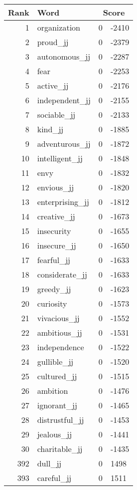\begin{longtable}[!htbp]{| rlr@{.}l |}
    \hline
    \textbf{Rank} & \textbf{Word} & \multicolumn{2}{c|}{\textbf{Score}} \\
    \hline
    \endhead
    1 & organization & 0 & -2410 \\
    2 & proud\_jj & 0 & -2379 \\
    3 & autonomous\_jj & 0 & -2287 \\
    4 & fear & 0 & -2253 \\
    5 & active\_jj & 0 & -2176 \\
    6 & independent\_jj & 0 & -2155 \\
    7 & sociable\_jj & 0 & -2133 \\
    8 & kind\_jj & 0 & -1885 \\
    9 & adventurous\_jj & 0 & -1872 \\
    10 & intelligent\_jj & 0 & -1848 \\
    11 & envy & 0 & -1832 \\
    12 & envious\_jj & 0 & -1820 \\
    13 & enterprising\_jj & 0 & -1812 \\
    14 & creative\_jj & 0 & -1673 \\
    15 & insecurity & 0 & -1655 \\
    16 & insecure\_jj & 0 & -1650 \\
    17 & fearful\_jj & 0 & -1633 \\
    18 & considerate\_jj & 0 & -1633 \\
    19 & greedy\_jj & 0 & -1623 \\
    20 & curiosity & 0 & -1573 \\
    21 & vivacious\_jj & 0 & -1552 \\
    22 & ambitious\_jj & 0 & -1531 \\
    23 & independence & 0 & -1522 \\
    24 & gullible\_jj & 0 & -1520 \\
    25 & cultured\_jj & 0 & -1515 \\
    26 & ambition & 0 & -1476 \\
    27 & ignorant\_jj & 0 & -1465 \\
    28 & distrustful\_jj & 0 & -1453 \\
    29 & jealous\_jj & 0 & -1441 \\
    30 & charitable\_jj & 0 & -1435 \\
    392 & dull\_jj & 0 & 1498 \\
    393 & careful\_jj & 0 & 1511 \\

\end{longtable}
